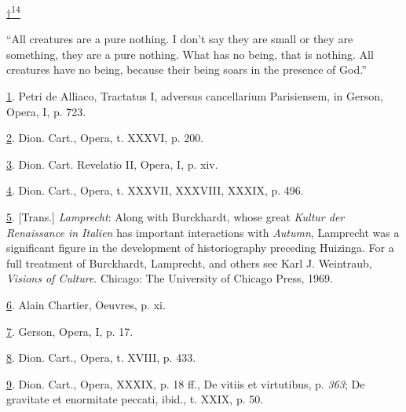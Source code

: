 \protect\hypertarget{23_NOTES.xhtmlux5cux23id_2606}{\protect\hyperlink{17_Chapter_Ten__THE_FAILURE_OF_IMAG.xhtmlux5cux23id_2605}{†\textsuperscript{14}}}
``All creatures are a pure nothing. I don't say they are small or they
are something, they are a pure nothing. What has no being, that is
nothing. All creatures have no being, because their being soars in the
presence of God.''

\protect\hypertarget{23_NOTES.xhtmlux5cux23id_735}{\protect\hyperlink{17_Chapter_Ten__THE_FAILURE_OF_IMAG.xhtmlux5cux23id_734}{1}}.
Petri de Alliaco, Tractatus I, adversus cancellarium Parisiensem, in
Gerson, Opera, I, p. 723.

\protect\hypertarget{23_NOTES.xhtmlux5cux23id_733}{\protect\hyperlink{17_Chapter_Ten__THE_FAILURE_OF_IMAG.xhtmlux5cux23id_732}{2}}.
Dion. Cart., Opera, t. XXXVI, p. 200.

\protect\hypertarget{23_NOTES.xhtmlux5cux23id_731}{\protect\hyperlink{17_Chapter_Ten__THE_FAILURE_OF_IMAG.xhtmlux5cux23id_730}{3}}.
Dion. Cart. Revelatio II, Opera, I, p. xiv.

\protect\hypertarget{23_NOTES.xhtmlux5cux23id_729}{\protect\hyperlink{17_Chapter_Ten__THE_FAILURE_OF_IMAG.xhtmlux5cux23id_728}{4}}.
Dion. Cart., Opera, t. XXXVII, XXXVIII, XXXIX, p. 496.

\protect\hypertarget{23_NOTES.xhtmlux5cux23id_727}{\protect\hyperlink{17_Chapter_Ten__THE_FAILURE_OF_IMAG.xhtmlux5cux23id_726}{5}}.
{[}Trans.{]} \emph{Lamprecht}: Along with Burckhardt, whose great
\emph{Kultur der Renaissance in Italien} has important interactions with
\emph{Autumn}, Lamprecht was a significant figure in the development of
historiography preceding Huizinga. For a full treatment of Burckhardt,
Lamprecht, and others see Karl J. Weintraub, \emph{Visions of Culture}.
Chicago: The University of Chicago Press, 1969.

\protect\hypertarget{23_NOTES.xhtmlux5cux23id_725}{\protect\hyperlink{17_Chapter_Ten__THE_FAILURE_OF_IMAG.xhtmlux5cux23id_724}{6}}.
Alain Chartier, Oeuvres, p. xi.

\protect\hypertarget{23_NOTES.xhtmlux5cux23id_723}{\protect\hyperlink{17_Chapter_Ten__THE_FAILURE_OF_IMAG.xhtmlux5cux23id_722}{7}}.
Gerson, Opera, I, p. 17.

\protect\hypertarget{23_NOTES.xhtmlux5cux23id_721}{\protect\hyperlink{17_Chapter_Ten__THE_FAILURE_OF_IMAG.xhtmlux5cux23id_720}{8}}.
Dion. Cart., Opera, t. XVIII, p. 433.

\protect\hypertarget{23_NOTES.xhtmlux5cux23id_719}{\protect\hyperlink{17_Chapter_Ten__THE_FAILURE_OF_IMAG.xhtmlux5cux23id_718}{9}}.
Dion. Cart., Opera, XXXIX, p. 18 ff., De vitiis et virtutibus, p.
\emph{363}; De gravitate et enormitate peccati, ibid., t. XXIX, p. 50.

